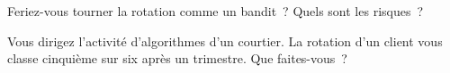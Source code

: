 \begin{interviewq}\label{iq:mx:the-buy-side-trading-desk-and-its-brokers:5}
Feriez-vous tourner la rotation comme un bandit~? Quels sont les risques~?
\end{interviewq}

\begin{interviewq}\label{iq:mx:the-buy-side-trading-desk-and-its-brokers:6}
Vous dirigez l'activité d'algorithmes d'un courtier. La rotation d'un client vous classe cinquième sur six après un trimestre. Que faites-vous~?
\end{interviewq}
